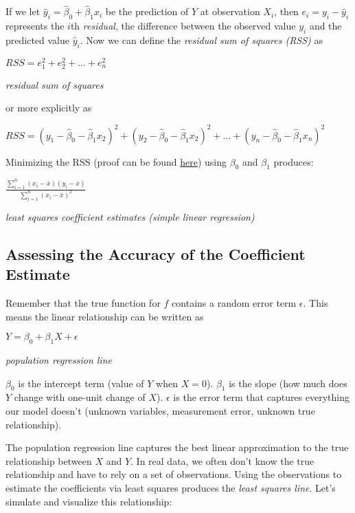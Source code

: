 \documentclass[]{book}
\begin{document}
If we let \(\hat y_i = \hat\beta_0 + \hat\beta_1x_i\) be the prediction of \(Y\) at observation \(X_i\), then \(e_i = y_i - \hat y_i\) represents the \(i\)th \emph{residual}, the difference between the observed value \(y_i\) and the predicted value \(\hat y_i\). Now we can define the \emph{residual sum of squares (RSS)} as

\(RSS = e_1^2 + e_2^2 + ... + e_n^2\)

\emph{residual sum of squares}

or more explicitly as

\(RSS = (y_1 - \hat\beta_0 - \hat\beta_1x_2)^2 + (y_2 - \hat\beta_0 - \hat\beta_1x_2)^2 + ... + (y_n - \hat\beta_0 - \hat\beta_1x_n)^2\)

Minimizing the RSS (proof can be found \href{https://en.m.wikipedia.org/wiki/Simple_linear_regression\#Derivation_of_simple_regression_estimators}{here}) using \(\beta_0\) and \(\beta_1\) produces:

\(\frac{\displaystyle \sum_{i=1}^{n}(x_i-\bar x)(y_i - \bar x)}{\displaystyle\sum_{i=1}^{n}(x_i - \bar x)^2}\)

\emph{least squares coefficient estimates (simple linear regression)}

\hypertarget{assessing-the-accuracy-of-the-coefficient-estimate}{%
\subsection{Assessing the Accuracy of the Coefficient Estimate}\label{assessing-the-accuracy-of-the-coefficient-estimate}}

Remember that the true function for \(f\) contains a random error term \(\epsilon\). This means the linear relationship can be written as

\(Y = \beta_0 + \beta_1X + \epsilon\)

\emph{population regression line}

\(\beta_0\) is the intercept term (value of \(Y\) when \(X = 0\)). \(\beta_1\) is the slope (how much does \(Y\) change with one-unit change of \(X\)). \(\epsilon\) is the error term that captures everything our model doesn't (unknown variables, measurement error, unknown true relationship).

The population regression line captures the best linear approximation to the true relationship between \(X\) and \(Y\). In real data, we often don't know the true relationship and have to rely on a set of observations. Using the observations to estimate the coefficients via least squares produces the \emph{least squares line}. Let's simulate and visualize this relationship:
\end{document}
